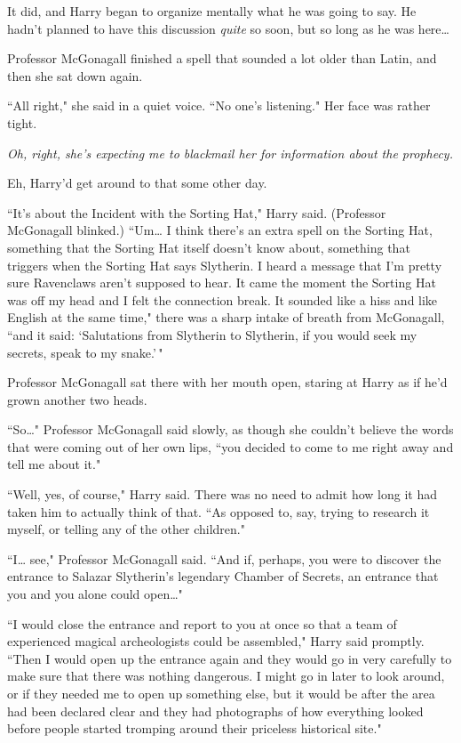 It did, and Harry began to organize mentally what he was going to say. He hadn't planned to have this discussion \emph{quite} so soon, but so long as he was here{\ldots}

Professor McGonagall finished a spell that sounded a lot older than Latin, and then she sat down again.

``All right," she said in a quiet voice. ``No one's listening." Her face was rather tight.

\emph{Oh, right, she's expecting me to blackmail her for information about the prophecy.}

Eh, Harry'd get around to that some other day.

``It's about the Incident with the Sorting Hat," Harry said. (Professor McGonagall blinked.) ``Um{\ldots} I think there's an extra spell on the Sorting Hat, something that the Sorting Hat itself doesn't know about, something that triggers when the Sorting Hat says Slytherin. I heard a message that I'm pretty sure Ravenclaws aren't supposed to hear. It came the moment the Sorting Hat was off my head and I felt the connection break. It sounded like a hiss and like English at the same time," there was a sharp intake of breath from McGonagall, ``and it said: `Salutations from Slytherin to Slytherin, if you would seek my secrets, speak to my snake.'\,"

Professor McGonagall sat there with her mouth open, staring at Harry as if he'd grown another two heads.

``So{\ldots}" Professor McGonagall said slowly, as though she couldn't believe the words that were coming out of her own lips, ``you decided to come to me right away and tell me about it."

``Well, yes, of course," Harry said. There was no need to admit how long it had taken him to actually think of that. ``As opposed to, say, trying to research it myself, or telling any of the other children."

``I{\ldots} see," Professor McGonagall said. ``And if, perhaps, you were to discover the entrance to Salazar Slytherin's legendary Chamber of Secrets, an entrance that you and you alone could open{\ldots}"

``I would close the entrance and report to you at once so that a team of experienced magical archeologists could be assembled," Harry said promptly. ``Then I would open up the entrance again and they would go in very carefully to make sure that there was nothing dangerous. I might go in later to look around, or if they needed me to open up something else, but it would be after the area had been declared clear and they had photographs of how everything looked before people started tromping around their priceless historical site."

